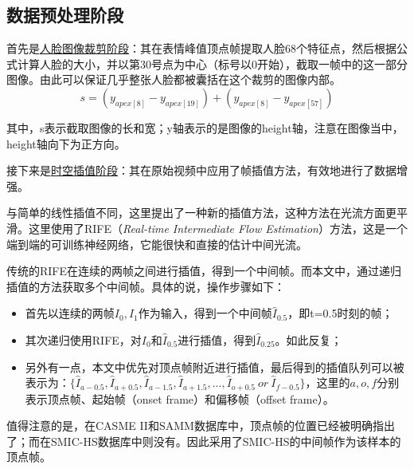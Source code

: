 \documentclass[AutoFakeBold]{MyFormat}
\begin{document}
\subsection{数据预处理阶段}
\par 首先是\underline{人脸图像裁剪阶段}：其在表情峰值顶点帧提取人脸68个特征点，然后根据公式计算人脸的大小，并以第30号点为中心（标号以0开始），截取一帧中的这一部分图像。由此可以保证几乎整张人脸都被囊括在这个裁剪的图像内部。
\begin{equation}
    s = (y_{apex[8]} - y_{apex[19]}) + (y_{apex[8]} - y_{apex[57]})
\end{equation}
\par 其中，s表示截取图像的长和宽；y轴表示的是图像的height轴，注意在图像当中，height轴向下为正方向。
\par 接下来是\underline{时空插值阶段}：其在原始视频中应用了帧插值方法，有效地进行了数据增强。
\par 与简单的线性插值不同，这里提出了一种新的插值方法，这种方法在光流方面更平滑。这里使用了RIFE（\textit{Real-time Intermediate Flow Estimation}）方法，这是一个端到端的可训练神经网络，它能很快和直接的估计中间光流。
\par 传统的RIFE在连续的两帧之间进行插值，得到一个中间帧。而本文中，通过递归插值的方法获取多个中间帧。具体的说，操作步骤如下：
\begin{itemize}
    \item 首先以连续的两帧$I_0, I_1$作为输入，得到一个中间帧$\hat{I}_{0.5}$，即t=0.5时刻的帧；
    \item 其次递归使用RIFE，对$I_0$和$\hat{I}_{0.5}$进行插值，得到$\hat{I}_{0.25}$。如此反复；
    \item 另外有一点，本文中优先对顶点帧附近进行插值，最后得到的插值队列可以被表示为：$\{\hat{I}_{a-0.5},\hat{I}_{a+0.5},\hat{I}_{a-1.5},\hat{I}_{a+1.5},...,\hat{I}_{o+0.5} \  or \  \hat{I}_{f-0.5}\}$，这里的$a, o, f$分别表示顶点帧、起始帧（onset frame）和偏移帧（offset frame）。
\end{itemize}
\par 值得注意的是，在CASME II和SAMM数据库中，顶点帧的位置已经被明确指出了；而在SMIC-HS数据库中则没有。因此采用了SMIC-HS的中间帧作为该样本的顶点帧。
\end{document}
